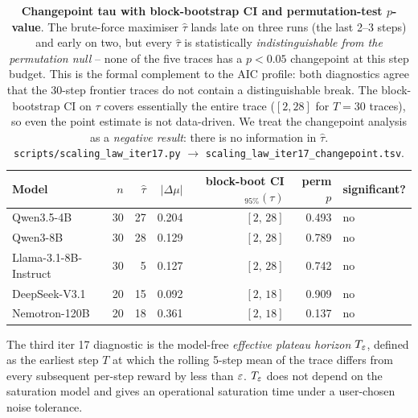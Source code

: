 \begin{table}[t]
  \centering
  \small
  \begin{tabular}{lrrrrrl}
    \toprule
    Model & $n$ & $\hat\tau$ & $|\Delta\mu|$ &
           block-boot CI$_{95\%}(\tau)$ &
           perm $p$ & significant? \\
    \midrule
    Qwen3.5-4B            & 30 & 27 & 0.204 & $[2,\,28]$  & 0.493 & no \\
    Qwen3-8B              & 30 & 28 & 0.129 & $[2,\,28]$  & 0.789 & no \\
    Llama-3.1-8B-Instruct & 30 &  5 & 0.127 & $[2,\,28]$  & 0.742 & no \\
    DeepSeek-V3.1         & 20 & 15 & 0.092 & $[2,\,18]$  & 0.909 & no \\
    Nemotron-120B         & 20 & 18 & 0.361 & $[2,\,18]$  & 0.137 & no \\
    \bottomrule
  \end{tabular}
  \caption{\textbf{Changepoint tau with block-bootstrap CI and
    permutation-test $p$-value}.  The brute-force maximiser
    $\hat\tau$ lands late on three runs (the last 2--3 steps)
    and early on two, but every $\hat\tau$ is
    statistically \emph{indistinguishable from the permutation
    null} -- none of the five traces has a
    $p < 0.05$ changepoint at this step budget.  This is the
    formal complement to the AIC profile: both diagnostics agree
    that the 30-step frontier traces do not contain a
    distinguishable break.  The block-bootstrap CI on $\tau$
    covers essentially the entire trace ($[2, 28]$ for $T = 30$
    traces), so even the point estimate is not data-driven.  We
    treat the changepoint analysis as a \emph{negative result}:
    there is no information in $\hat\tau$.
    \texttt{scripts/scaling\_law\_iter17.py} $\to$
    \texttt{scaling\_law\_iter17\_changepoint.tsv}.}
  \label{tab:scaling-iter17-changepoint}
\end{table}

The third iter 17 diagnostic is the model-free
\emph{effective plateau horizon} $T_\varepsilon$, defined as the
earliest step $T$ at which the rolling 5-step mean of the trace
differs from every subsequent per-step reward by less than
$\varepsilon$.  $T_\varepsilon$ does not depend on the saturation model and
gives an operational saturation time under a user-chosen
noise tolerance.


